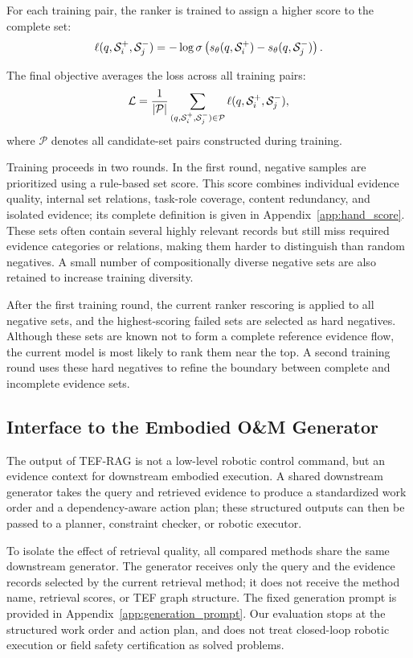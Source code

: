 For each training pair, the ranker is trained to assign a higher score to the complete set:
\begin{equation}
\ell(q,\mathcal{S}_i^+,\mathcal{S}_j^-)
=
-\log \sigma\left(
s_{\theta}(q,\mathcal{S}_i^+)
-
s_{\theta}(q,\mathcal{S}_j^-)
\right).
\label{eq:ranknet_pair_loss}
\end{equation}

The final objective averages the loss across all training pairs:
\begin{equation}
\mathcal{L}
=
\frac{1}{|\mathcal{P}|}
\sum_{(q,\mathcal{S}_i^+,\mathcal{S}_j^-)\in\mathcal{P}}
\ell(q,\mathcal{S}_i^+,\mathcal{S}_j^-),
\label{eq:ranknet_loss}
\end{equation}
where $\mathcal{P}$ denotes all candidate-set pairs constructed during training.

Training proceeds in two rounds. In the first round, negative samples are prioritized using a rule-based set score. This score combines individual evidence quality, internal set relations, task-role coverage, content redundancy, and isolated evidence; its complete definition is given in Appendix~\ref{app:hand_score}. These sets often contain several highly relevant records but still miss required evidence categories or relations, making them harder to distinguish than random negatives. A small number of compositionally diverse negative sets are also retained to increase training diversity.

After the first training round, the current ranker rescoring is applied to all negative sets, and the highest-scoring failed sets are selected as hard negatives. Although these sets are known not to form a complete reference evidence flow, the current model is most likely to rank them near the top. A second training round uses these hard negatives to refine the boundary between complete and incomplete evidence sets.

\subsection{Interface to the Embodied O\&M Generator}

The output of TEF-RAG is not a low-level robotic control command, but an evidence context for downstream embodied execution. A shared downstream generator takes the query and retrieved evidence to produce a standardized work order and a dependency-aware action plan; these structured outputs can then be passed to a planner, constraint checker, or robotic executor.

To isolate the effect of retrieval quality, all compared methods share the same downstream generator. The generator receives only the query and the evidence records selected by the current retrieval method; it does not receive the method name, retrieval scores, or TEF graph structure. The fixed generation prompt is provided in Appendix~\ref{app:generation_prompt}. Our evaluation stops at the structured work order and action plan, and does not treat closed-loop robotic execution or field safety certification as solved problems.